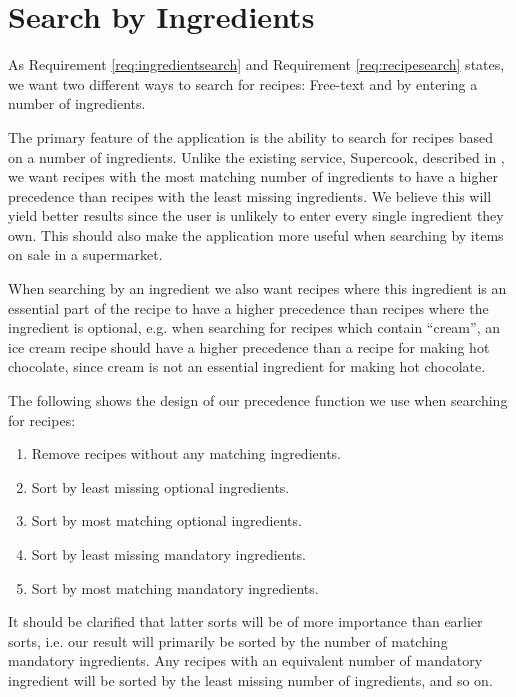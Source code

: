 \section{Search by Ingredients}\label{sec:design_search}

As Requirement \ref{req:ingredientsearch} and Requirement \ref{req:recipesearch} states, we want two different ways to search for recipes: Free-text and by entering a number of ingredients.

The primary feature of the application is the ability to search for recipes based on a number of ingredients. Unlike the existing service, Supercook, described in , we want recipes with the most matching number of ingredients to have a higher precedence than recipes with the least missing ingredients. We believe this will yield better results since the user is unlikely to enter every single ingredient they own. This should also make the application more useful when searching by items on sale in a supermarket.

When searching by an ingredient we also want recipes where this ingredient is an essential part of the recipe to have a higher precedence than recipes where the ingredient is optional, e.g. when searching for recipes which contain ``cream'', an ice cream recipe should have a higher precedence than a recipe for making hot chocolate, since cream is not an essential ingredient for making hot chocolate.

 The following shows the design of our precedence function we use when searching for recipes:
\begin{enumerate}
	\item Remove recipes without any matching ingredients.
	\item Sort by least missing optional ingredients.
	\item Sort by most matching optional ingredients.
	\item Sort by least missing mandatory ingredients.
	\item Sort by most matching mandatory ingredients.
\end{enumerate}
It should be clarified that latter sorts will be of more importance than earlier sorts, i.e. our result will primarily be sorted by the number of matching mandatory ingredients. Any recipes with an equivalent number of mandatory ingredient will be sorted by the least missing number of ingredients, and so on.